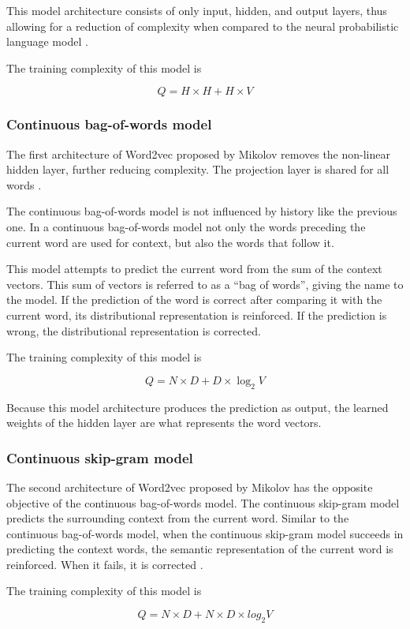 \documentclass[14pt, a4paper]{extreport}
\begin{document}
This model architecture consists of only input, hidden, and output layers, thus allowing for a reduction of complexity when compared to the neural probabilistic language model \parencite{mikolov}.

The training complexity of this model is

\[Q = H \times H + H \times V\]
      \subsubsection{Continuous bag-of-words model}
The first architecture of Word2vec proposed by Mikolov removes the non-linear hidden layer, further reducing complexity. The projection layer is shared for all words \parencite{mikolov}.

The continuous bag-of-words model is not influenced by history like the previous one. In a continuous bag-of-words model not only the words preceding the current word are used for context, but also the words that follow it.

This model attempts to predict the current word from the sum of the context vectors. This sum of vectors is referred to as a ``bag of words'', giving the name to the model. If the prediction of the word is correct after comparing it with the current word, its distributional representation is reinforced. If the prediction is wrong, the distributional representation is corrected.

The training complexity of this model is

\[Q = N \times D + D \times \log_2{V}\]

Because this model architecture produces the prediction as output, the learned weights of the hidden layer are what represents the word vectors.
      \subsubsection{Continuous skip-gram model}
The second architecture of Word2vec proposed by Mikolov has the opposite objective of the continuous bag-of-words model. The continuous skip-gram model predicts the surrounding context from the current word. Similar to the continuous bag-of-words model, when the continuous skip-gram model succeeds in predicting the context words, the semantic representation of the current word is reinforced. When it fails, it is corrected \parencite{mikolov}.

The training complexity of this model is

\[Q = N \times D + N \times D \times log_2{V} \]
\end{document}
